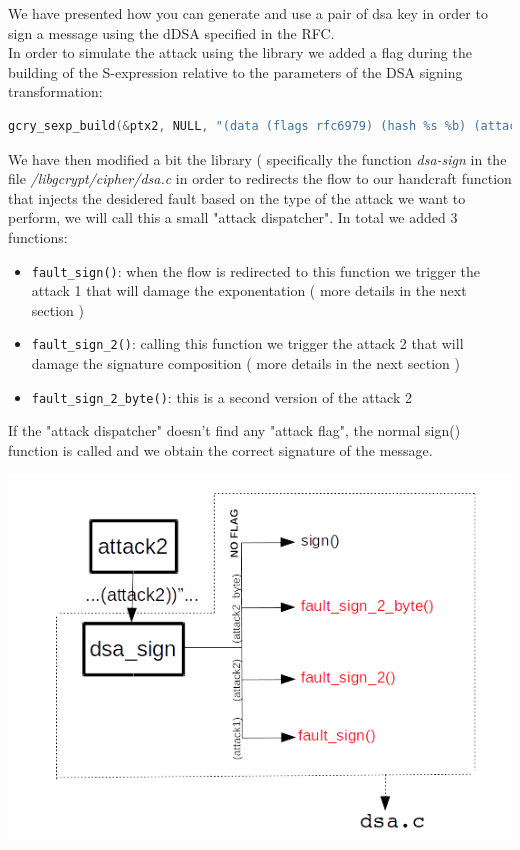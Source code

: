 \documentclass[11pt,english]{article}
\begin{document}
We have presented how you can generate and use a pair of dsa key in order to sign a message using the dDSA specified in the RFC\cite{rfc}. \\
In order to simulate the attack using the library we added a flag during the building of the S-expression relative to the parameters of the DSA signing transformation:

\begin{lstlisting}[language=c]
gcry_sexp_build(&ptx2, NULL, "(data (flags rfc6979) (hash %s %b) (attack2))" , "sha1", hash_len , digest);
\end{lstlisting}

We have then modified a bit the library ( specifically the function \textit{dsa-sign} in the file \textit{/libgcrypt/cipher/dsa.c} in order to redirects the flow to our handcraft function that injects the desidered fault based on the type of the attack we want to perform, we will call this a small "attack dispatcher". In total we added 3 functions:
\begin{itemize}
\item \texttt{fault\_sign()}: when the flow is redirected to this function we trigger the attack 1 that will damage the exponentation ( more details in the next section )
\item \texttt{fault\_sign\_2()}: calling this function we trigger the attack 2 that will damage the signature composition ( more details in the next section )
\item \texttt{fault\_sign\_2\_byte()}: this is a second version of the attack 2
\end{itemize}

If the "attack dispatcher" doesn't find any "attack flag", the normal sign() function is called and we obtain the correct signature of the message. 

\includegraphics[width=1.0\textwidth]{img/img_3.png} \\
\end{document}
